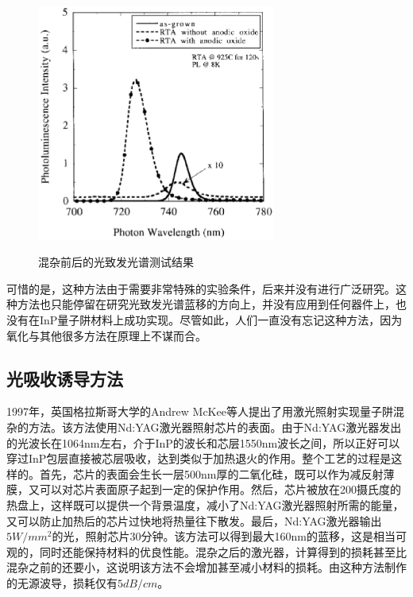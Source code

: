 \documentclass{ZJUthesis}
\begin{document}
\begin{figure}[!htb]
  \centering
  \includegraphics[width=0.7\textwidth]{./Pictures/oxide_pl.eps}\\
  \caption{混杂前后的光致发光谱测试结果}
  \label{fig_oxide_pl}
\end{figure}

可惜的是，这种方法由于需要非常特殊的实验条件，后来并没有进行广泛研究。这种方法也只能停留在研究光致发光谱蓝移的方向上，并没有应用到任何器件上，也没有在InP量子阱材料上成功实现。尽管如此，人们一直没有忘记这种方法，因为氧化与其他很多方法在原理上不谋而合\cite{dubowski1999enhanced}\cite{liu2012xps}\cite{liu2013chemical}。

\subsection{光吸收诱导方法}

1997年，英国格拉斯哥大学的Andrew McKee等人提出了用激光照射实现量子阱混杂的方法\cite{mckee1997monolithic-PAID}。该方法使用Nd:YAG激光器照射芯片的表面。由于Nd:YAG激光器发出的光波长在1064nm左右，介于InP的波长和芯层1550nm波长之间，所以正好可以穿过InP包层直接被芯层吸收，达到类似于加热退火的作用。整个工艺的过程是这样的。首先，芯片的表面会生长一层500nm厚的二氧化硅，既可以作为减反射薄膜，又可以对芯片表面原子起到一定的保护作用。然后，芯片被放在200摄氏度的热盘上，这样既可以提供一个背景温度，减小了Nd:YAG激光器照射所需的能量，又可以防止加热后的芯片过快地将热量往下散发。最后，Nd:YAG激光器输出$5W/mm^2$的光，照射芯片30分钟。该方法可以得到最大160nm的蓝移，这是相当可观的，同时还能保持材料的优良性能。混杂之后的激光器，计算得到的损耗甚至比混杂之前的还要小，这说明该方法不会增加甚至减小材料的损耗。由这种方法制作的无源波导，损耗仅有$5dB/cm$。
\end{document}
